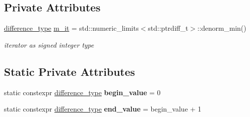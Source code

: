 \subsection*{Private Attributes}
\begin{DoxyCompactItemize}
\item 
\hypertarget{classnlohmann_1_1basic__json_1_1primitive__iterator__t_aed1a94e17ea6a32cc75baa55e239b002_aed1a94e17ea6a32cc75baa55e239b002}{\hyperlink{classnlohmann_1_1basic__json_aec316934a555dd1acdd3600e5d4a4cdf_aec316934a555dd1acdd3600e5d4a4cdf}{difference\-\_\-type} \hyperlink{classnlohmann_1_1basic__json_1_1primitive__iterator__t_aed1a94e17ea6a32cc75baa55e239b002_aed1a94e17ea6a32cc75baa55e239b002}{m\-\_\-it} = std\-::numeric\-\_\-limits$<$std\-::ptrdiff\-\_\-t$>$\-::denorm\-\_\-min()}\label{classnlohmann_1_1basic__json_1_1primitive__iterator__t_aed1a94e17ea6a32cc75baa55e239b002_aed1a94e17ea6a32cc75baa55e239b002}

\begin{DoxyCompactList}\small\item\em iterator as signed integer type \end{DoxyCompactList}\end{DoxyCompactItemize}
\subsection*{Static Private Attributes}
\begin{DoxyCompactItemize}
\item 
\hypertarget{classnlohmann_1_1basic__json_1_1primitive__iterator__t_a6312044b97f73ace84ee525e7586f047_a6312044b97f73ace84ee525e7586f047}{static constexpr \hyperlink{classnlohmann_1_1basic__json_aec316934a555dd1acdd3600e5d4a4cdf_aec316934a555dd1acdd3600e5d4a4cdf}{difference\-\_\-type} {\bfseries begin\-\_\-value} = 0}\label{classnlohmann_1_1basic__json_1_1primitive__iterator__t_a6312044b97f73ace84ee525e7586f047_a6312044b97f73ace84ee525e7586f047}

\item 
\hypertarget{classnlohmann_1_1basic__json_1_1primitive__iterator__t_a5b4e565be92fff90c8d5708a7e134313_a5b4e565be92fff90c8d5708a7e134313}{static constexpr \hyperlink{classnlohmann_1_1basic__json_aec316934a555dd1acdd3600e5d4a4cdf_aec316934a555dd1acdd3600e5d4a4cdf}{difference\-\_\-type} {\bfseries end\-\_\-value} = begin\-\_\-value + 1}\label{classnlohmann_1_1basic__json_1_1primitive__iterator__t_a5b4e565be92fff90c8d5708a7e134313_a5b4e565be92fff90c8d5708a7e134313}

\end{DoxyCompactItemize}


